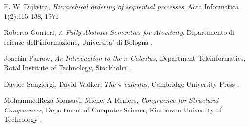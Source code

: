 \begin{thebibliography}{99}

  E. W. Dijkstra,
  \emph{Hierarchical ordering of sequential processes},
  Acta Informatica 1(2):115-138, 
  1971
  .


  Roberto Gorrieri,
  \emph{A Fully-Abstract Semantics for Atomicity},
  Dipartimento di scienze dell'informazione, 
  Universita' di Bologna
  .


  Joachin Parrow, 
  \emph{An Introduction to the $\pi$ Calculus},
  Department Teleinformatics,
  Rotal Institute of Technology,
  Stockholm
  .


  Davide Sangiorgi, David Walker,
  \emph{The $\pi$-calculus},
  Cambridge University Press
  .


  MohammedReza Mousavi, Michel A Reniers,
  \emph{Congruence for Structural Congruences},
  Department of Computer Science,
  Eindhoven University of Technology
  .


\end{thebibliography}
